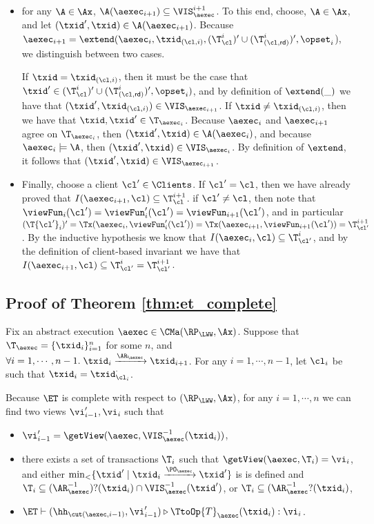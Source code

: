 \begin{itemize}
\item for any $\A \in \Ax$, $\A(\aexec_{i+1}) \subseteq \VIS_{\aexec}^{i+1}$. 
To this end, choose, $\A \in \Ax$, and let $(\txid', \txid) \in \A(\aexec_{i+1})$. 
Because $\aexec_{i+1} = \extend(\aexec_{i}, \txid_{(\cl, i)}, (\T_{\cl}^{i})' \cup (\T_{(\cl, \mathsf{rd})}^{i})', \opset_{i}$), 
we distinguish between two cases.

If $\txid = \txid_{(\cl, i)}$, then it must be the case that $\txid' \in (\T^{i}_{\cl})' \cup (\T_{(\cl, \mathsf{rd})}^{i})', \opset_{i})$, 
and by definition of $\extend(\_)$ we have that $(\txid' ,\txid_{(\cl, i)}) \in \VIS_{\aexec_{i+1}}$. 
If $\txid \neq \txid_{(\cl, i)}$, then we have that $\txid, \txid' \in \T_{\aexec_{i}}$. Because 
$\aexec_{i}$ and $\aexec_{i+1}$ agree on $\T_{\aexec_{i}}$, then $(\txid', \txid) \in \A(\aexec_{i})$, 
and because $\aexec_{i} \models \A$, then $(\txid', \txid) \in \VIS_{\aexec_{i}}$. By definition of 
$\extend$, it follows that $(\txid', \txid) \in \VIS_{\aexec_{i+1}}$.

\item Finally, choose a client $\cl' \in \Clients$. If $\cl' = \cl$, then we have already proved that 
$I(\aexec_{i+1}, \cl) \subseteq \T_{\cl}^{i+1}$. 
if $\cl' \neq \cl$, then note that $\viewFun_{i}(\cl') = \viewFun'_{i}(\cl') = \viewFun_{i+1}(\cl')$, 
and in particular $(\T{\cl'}_{i})' = \Tx(\aexec_{i}, \viewFun'_{i}(\cl')) = \Tx(\aexec_{i+1}, \viewFun_{i+1}(\cl')) =  \T_{\cl'}^{i+1}$.
By the inductive hypothesis we know that $I(\aexec_{i}, \cl) \subseteq \T_{\cl'}^{i}$, 
and by the definition of client-based invariant we have that $I(\aexec_{i+1}, \cl) \subseteq \T_{\cl'}^{i} = \T_{\cl'}^{i+1}$. 
\end{itemize}

\subsection{Proof of Theorem \ref{thm:et_complete}}
\label{sec:et-completeness}
Fix an abstract execution $\aexec \in \CMa(\RP_{\LWW}, \Ax)$. 
Suppose that $\T_{\aexec} = \{\txid_{i}\}_{i=1}^{n}$ for some $n$, and 
$\forall i=1,\cdots,n-1.\;\txid_{i} \xrightarrow{\AR_{\aexec}} \txid_{i+1}$.
For any $i=1,\cdots,n-1$, let $\cl_{i}$ be such that $\txid_{i} = \txid_{\cl_{i}}^{\cdot}$.

Because $\ET$ is complete with respect to $(\RP_{\LWW}, \Ax)$, 
for any $i=1,\cdots,n$ we can find two views $\vi'_{i-1}, \vi_{i}$ such that 
\begin{itemize}
\item $\vi'_{i-1} = \getView(\aexec, \VIS^{-1}_{\aexec}(\txid_{i}))$, 
\item there exists a set of transactions $\T_{i}$ such that $\getView(\aexec, \T_{i}) = \vi_{i}$, and 
either $\min_{<}\{\txid' \mid \txid_{i} \xrightarrow{\PO_{\aexec}} \txid'\}$ is 
is defined and $\T_{i} \subseteq (\AR_{\aexec}^{-1})?(\txid_{i}) \cap \VIS^{-1}_{\aexec}(\txid')$, 
or $\T_{i} \subseteq (\AR_{\aexec}^{-1}?(\txid_{i})$, 
\item $\ET \vdash (\hh_{\cut(\aexec, i-1)}, \vi'_{i-1}) \triangleright \TtoOp{T}_{\aexec}(\txid_{i}): \vi_{i}$.
\end{itemize}

